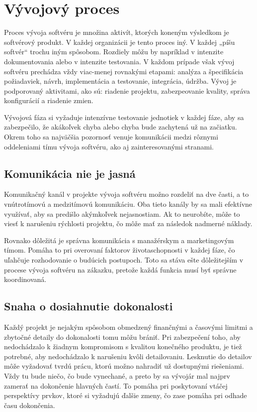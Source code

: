 \documentclass[10pt,twoside,slovak,a4paper]{article}
\begin{document}
\section{Vývojový proces}
Proces vývoja softvéru je množina aktivít, ktorých koneným výsledkom je softvérový
produkt. V každej organizácii je tento proces iný. V každej „píšu softvér“ trochu iným
spôsobom. Rozdiely môžu by napríklad v intenzite dokumentovania alebo v intenzite
testovania.
V každom prípade však vývoj softvéru prechádza vždy viac-menej rovnakými etapami:
analýza a špecifikácia požiadaviek, návrh, implementácia a testovanie, integrácia, údržba.
Vývoj je podporovaný aktivitami, ako sú: riadenie projektu, zabezpeovanie kvality, správa
konfigurácií a riadenie zmien.\cite{VyvojProces3}

Vývojová fáza si vyžaduje intenzívne testovanie jednotiek v každej fáze, aby sa zabezpečilo, že akákoľvek chyba alebo chyba bude zachytená už na začiatku. Okrem toho sa najväčšia pozornosť venuje komunikácii medzi rôznymi oddeleniami tímu vývoja softvéru, ako aj zainteresovanými stranami.

\subsection{Komunikácia nie je jasná}
Komunikačný kanál v projekte vývoja softvéru možno rozdeliť na dve časti, a to vnútrotímovú a medzitímovú komunikáciu. Oba tieto kanály by sa mali efektívne využívať, aby sa predišlo akýmkoľvek nejasnostiam. Ak to neurobíte, môže to viesť k narušeniu rýchlosti projektu, čo môže mať za následok nadmerné náklady.

Rovnako dôležitá je správna komunikácia s manažérskym a marketingovým tímom. Pomáha to pri overovaní faktorov životaschopnosti v každej fáze, čo uľahčuje rozhodovanie o budúcich postupoch. Toto sa stáva ešte dôležitejším v procese vývoja softvéru na zákazku, pretože každá funkcia musí byť správne koordinovaná.


\subsection{Snaha o dosiahnutie dokonalosti}
Každý projekt je nejakým spôsobom obmedzený finančnými a časovými limitmi a zbytočné detaily do dokonalosti tomu môžu brániť. Pri zabezpečení toho, aby nedochádzalo k žiadnym kompromisom s kvalitou konečného produktu, je tiež potrebné, aby nedochádzalo k narušeniu kvôli detailovaniu. Lesknutie do detailov môže vyžadovať tvrdú prácu, ktorú možno nahradiť už dostupnými riešeniami. Vždy tu bude niečo, čo bude vynechané, a preto by sa vývojár mal najprv zamerať na dokončenie hlavných častí. To pomáha pri poskytovaní vtáčej perspektívy prvkov, ktoré si vyžadujú ďalšie zmeny, čo zase pomáha pri odhade času dokončenia.
\end{document}
